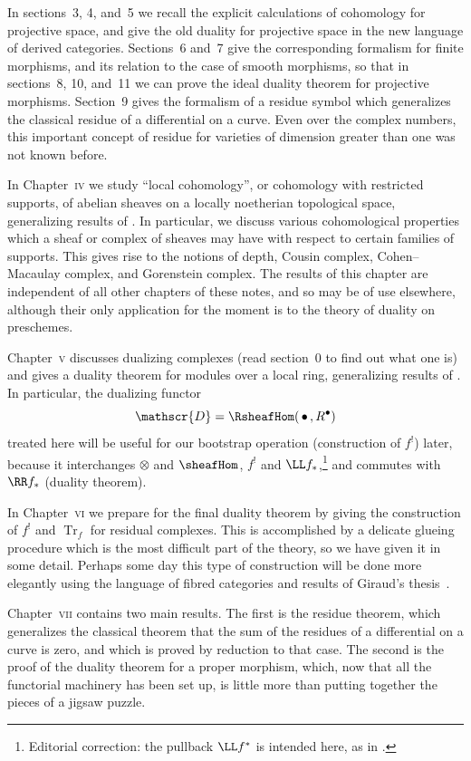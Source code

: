 In sections~3, 4, and~5 we recall the explicit calculations of cohomology for projective space, and give the old duality for projective space in the new language of derived categories. Sections~6 and~7 give the corresponding formalism for finite morphisms, and its relation to the case of smooth morphisms, so that in sections~8, 10, and~11 we can prove the ideal duality theorem for projective morphisms. Section~9 gives the formalism of a residue symbol which generalizes the classical residue of a differential on a curve. Even over the complex numbers, this important concept of residue for varieties of dimension greater than one was not known before.

In Chapter~\textsc{iv} we study ``local cohomology'', or cohomology with restricted supports, of abelian sheaves on a locally noetherian topological space, generalizing results of \cite[\nopp \S\S1,3]{LC}. In particular, we discuss various cohomological properties which a sheaf or complex of sheaves may have with respect to certain families of supports. This gives rise to the notions of depth, Cousin complex, Cohen--Macaulay complex, and Gorenstein complex. The results of this chapter are independent of all other chapters of these notes, and so may be of use elsewhere, although their only application for the moment is to the theory of duality on preschemes.

Chapter~\textsc{v} discusses dualizing complexes (read section~0 to find out what one is) and gives a duality theorem for modules over a local ring, generalizing results of \cite[\nopp \S\S2,4,6]{LC}. In particular, the dualizing functor
\[
\mathscr{D} = \RsheafHom(\,\bullet\,, R^{\bullet})
\]
treated here will be useful for our bootstrap operation (construction of $f^{!}$) later, because it interchanges $\otimes$ and $\sheafHom$, $f^{!}$ and $\LL f_{*}$,\footnote{Editorial correction: the pullback $\LL f^{*}$ is intended here, as in .} and commutes with $\RR f_{*}$ (duality theorem).

In Chapter~\textsc{vi} we prepare for the final duality theorem by giving the construction of $f^{!}$ and $\operatorname{Tr}_{f}$ for residual complexes. This is accomplished by a delicate glueing procedure which is the most difficult part of the theory, so we have given it in some detail. Perhaps some day this type of construction will be done more elegantly using the language of fibred categories and results of Giraud's thesis~\cite{6}.

Chapter~\textsc{vii} contains two main results. The first is the residue theorem, which generalizes the classical theorem that the sum of the residues of a differential on a curve is zero, and which is proved by reduction to that case. The second is the proof of the duality theorem for a proper morphism, which, now that all the functorial machinery has been set up, is little more than putting together the pieces of a jigsaw puzzle.

